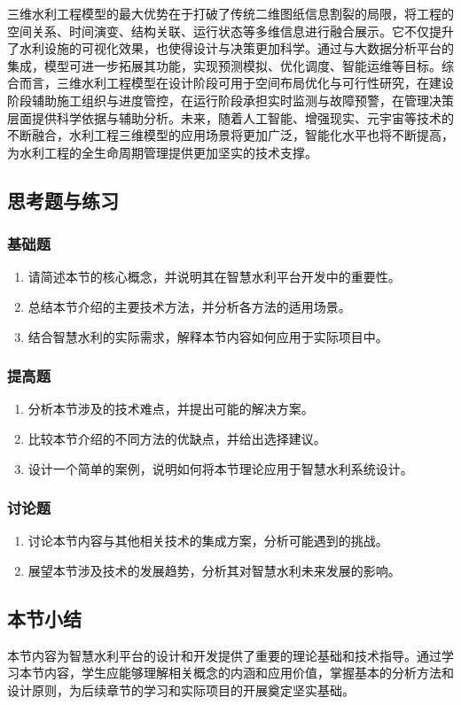 三维水利工程模型的最大优势在于打破了传统二维图纸信息割裂的局限，将工程的空间关系、时间演变、结构关联、运行状态等多维信息进行融合展示。它不仅提升了水利设施的可视化效果，也使得设计与决策更加科学。通过与大数据分析平台的集成，模型可进一步拓展其功能，实现预测模拟、优化调度、智能运维等目标。综合而言，三维水利工程模型在设计阶段可用于空间布局优化与可行性研究，在建设阶段辅助施工组织与进度管控，在运行阶段承担实时监测与故障预警，在管理决策层面提供科学依据与辅助分析。未来，随着人工智能、增强现实、元宇宙等技术的不断融合，水利工程三维模型的应用场景将更加广泛，智能化水平也将不断提高，为水利工程的全生命周期管理提供更加坚实的技术支撑。 \subsection{思考题与练习}\label{ux601dux8003ux9898ux4e0eux7ec3ux4e60} \subsubsection{基础题}\label{ux57faux7840ux9898} \begin{enumerate} \def\labelenumi{\arabic{enumi}.} \item 请简述本节的核心概念，并说明其在智慧水利平台开发中的重要性。 \item 总结本节介绍的主要技术方法，并分析各方法的适用场景。 \item 结合智慧水利的实际需求，解释本节内容如何应用于实际项目中。 \end{enumerate} \subsubsection{提高题}\label{ux63d0ux9ad8ux9898} \begin{enumerate} \def\labelenumi{\arabic{enumi}.} \setcounter{enumi}{3} \item 分析本节涉及的技术难点，并提出可能的解决方案。 \item 比较本节介绍的不同方法的优缺点，并给出选择建议。 \item 设计一个简单的案例，说明如何将本节理论应用于智慧水利系统设计。 \end{enumerate} \subsubsection{讨论题}\label{ux8ba8ux8bbaux9898} \begin{enumerate} \def\labelenumi{\arabic{enumi}.} \setcounter{enumi}{6} \item 讨论本节内容与其他相关技术的集成方案，分析可能遇到的挑战。 \item 展望本节涉及技术的发展趋势，分析其对智慧水利未来发展的影响。 \end{enumerate} \subsection{本节小结}\label{ux672cux8282ux5c0fux7ed3} 本节内容为智慧水利平台的设计和开发提供了重要的理论基础和技术指导。通过学习本节内容，学生应能够理解相关概念的内涵和应用价值，掌握基本的分析方法和设计原则，为后续章节的学习和实际项目的开展奠定坚实基础。

